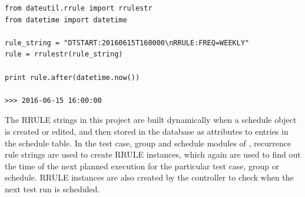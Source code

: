 \begin{lstlisting}[caption=Recursion Rule, label={listing.rrule}]
from dateutil.rrule import rrulestr
from datetime import datetime

rule_string = "DTSTART:20160615T160000\nRRULE:FREQ=WEEKLY"
rule = rrulestr(rule_string)
 
print rule.after(datetime.now())
 
>>> 2016-06-15 16:00:00
\end{lstlisting}


The RRULE strings in this project are built dynamically when a schedule object is created or edited, and then stored in the database as attributes to entries in the schedule table. In the test case, group and schedule modules of \toolname, recurrence rule strings are used to create RRULE instances, which again are used to find out the time of the next planned execution for the particular test case, group or schedule. RRULE instances are also created by the controller to check when the next test run is scheduled.


